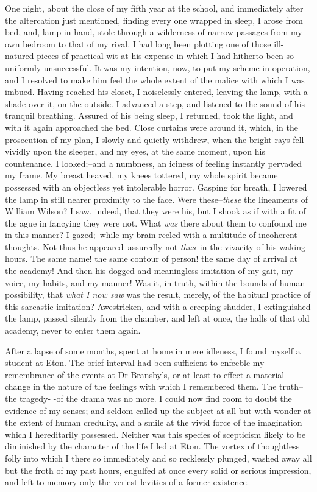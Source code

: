 \documentclass[12pt]{book}
\begin{document}
     One night, about the close of my fifth year at the school, and
immediately after the altercation just mentioned, finding every one
wrapped in sleep, I arose from bed, and, lamp in hand, stole
through a wilderness of narrow passages from my own bedroom to that
of my rival.  I had long been plotting one of those ill-natured
pieces of practical wit at his expense in which I had hitherto been
so uniformly unsuccessful.  It was my intention, now, to put my
scheme in operation, and I resolved to make him feel the whole
extent of the malice with which I was imbued.  Having reached his
closet, I noiselessly entered, leaving the lamp, with a shade over
it, on the outside.  I advanced a step, and listened to the sound
of his tranquil breathing.  Assured of his being sleep, I returned,
took the light, and with it again approached the bed.  Close
curtains were around it, which, in the prosecution of my plan, I
slowly and quietly withdrew, when the bright rays fell vividly upon
the sleeper, and my eyes, at the same moment, upon his countenance. 
I looked;--and a numbness, an iciness of feeling instantly pervaded
my frame.  My breast heaved, my knees tottered, my whole spirit
became possessed with an objectless yet intolerable horror. 
Gasping for breath, I lowered the lamp in still nearer proximity to
the face.  Were these--\emph{these} the lineaments of  William
Wilson?  I saw, indeed, that they were his, but I shook as if with
a fit of the ague in fancying they were not.  What \emph{was} there
about them to confound me in this manner?  I gazed;--while my brain
reeled with a multitude of incoherent thoughts.  Not thus he
appeared--assuredly not \emph{thus}--in the vivacity of his waking
hours.  The same name! the same contour of person! the same day of
arrival at the academy!  And then his dogged and meaningless
imitation of my gait, my voice, my habits, and my manner!  Was it,
in truth, within the bounds of human possibility, that \emph{what I
now saw} was the result, merely, of the habitual practice of this
sarcastic imitation?  Awestricken, and with a creeping shudder, I
extinguished the lamp, passed silently from the chamber, and left
at once, the halls of that old academy, never to enter them again.

     After a lapse of some months, spent at home in mere idleness,
I found myself a student at Eton.  The brief interval had been
sufficient to enfeeble my remembrance of the events at Dr
Bransby's, or at least to effect a material change in the nature of
the feelings with which I remembered them.  The truth--the tragedy-
-of the drama was no more.  I could now find room to doubt the
evidence of my senses; and seldom called up the subject at all but
with wonder at the extent of human credulity, and a smile at the
vivid force of the imagination which I hereditarily possessed. 
Neither was this species of scepticism likely to be diminished by
the character of the life I led at Eton.  The vortex of thoughtless
folly into which I there so immediately and so recklessly plunged,
washed away all but the froth of my past hours, engulfed at once
every solid or serious impression, and left to memory only the
veriest levities of a former existence.
\end{document}
